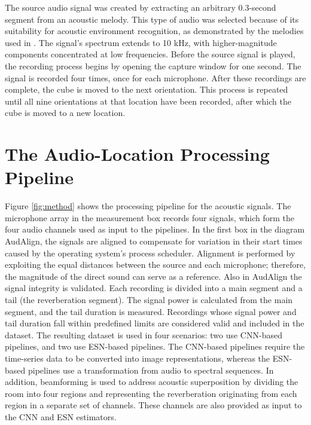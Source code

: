 The source audio signal was created by extracting an arbitrary 0.3-second segment from an acoustic melody. This type of audio was selected because of its suitability for acoustic environment recognition, as demonstrated by the melodies used in \cite{RIR05}. The signal's spectrum extends to 10 kHz, with higher-magnitude components concentrated at low frequencies. Before the source signal is played, the recording process begins by opening the capture window for one second. The signal is recorded four times, once for each microphone. After these recordings are complete, the cube is moved to the next orientation. This process is repeated until all nine orientations at that location have been recorded, after which the cube is moved to a new location.



\section{The Audio-Location Processing Pipeline}


Figure \ref{fig:method} shows the processing pipeline for the acoustic signals. The microphone array in the measurement box records four signals, which form the four audio channels used as input to the pipelines. In the first box in the diagram AudAlign, the signals are aligned to compensate for variation in their start times caused by the operating system's process scheduler. Alignment is performed by exploiting the equal distances between the source and each microphone; therefore, the magnitude of the direct sound can serve as a reference. Also in AudAlign the signal integrity is validated. Each recording is divided into a main segment and a tail (the reverberation segment). The signal power is calculated from the main segment, and the tail duration is measured. Recordings whose signal power and tail duration fall within predefined limits are considered valid and included in the dataset. The resulting dataset is used in four scenarios: two use CNN-based pipelines, and two use ESN-based pipelines. The CNN-based pipelines require the time-series data to be converted into image representations, whereas the ESN-based pipelines use a transformation from audio to spectral sequences. In addition, beamforming is used to address acoustic superposition by dividing the room into four regions and representing the reverberation originating from each region in a separate set of channels. These channels are also provided as input to the CNN and ESN estimators.


